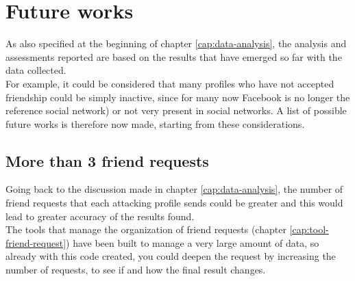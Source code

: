 
\chapter{Future works}
\label{cap:future-works}
As also specified at the beginning of chapter \ref{cap:data-analysis}, the analysis and assessments reported are based on the results that have emerged so far with the data collected. \\ For example, it could be considered that many profiles who have not accepted friendship could be simply inactive, since for many now Facebook is no longer the reference social network) or not very present in social networks.
A list of possible future works is therefore now made, starting from these considerations.

\section{More than 3 friend requests}
Going back to the discussion made in chapter \ref{cap:data-analysis}, the number of friend requests that each attacking profile sends could be greater and this would lead to greater accuracy of the results found. \\The tools that manage the organization of friend requests (chapter \ref{cap:tool-friend-request}) have been built to manage a very large amount of data, so already with this code created, you could deepen the request by increasing the number of requests, to see if and how the final result changes.

